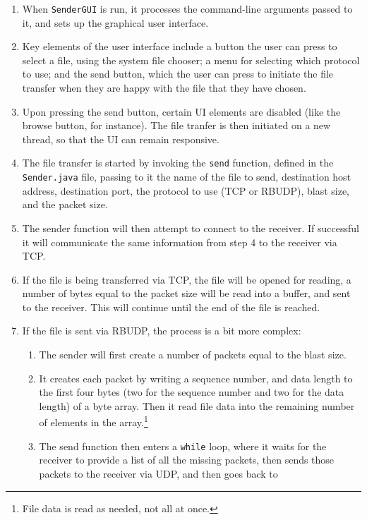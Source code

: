 \documentclass[10pt, a4paper]{article}
\begin{document}
\begin{enumerate}
  \item When \texttt{SenderGUI} is run, it processes the command-line arguments
    passed to it, and sets up the graphical user interface.
  \item Key elements of the user interface include a button the user can press
    to select a file, using the system file chooser; a menu for selecting which
    protocol to use; and the send button, which the user can press to initiate
    the file transfer when they are happy with the file that they have chosen.
  \item Upon pressing the send button, certain UI elements are disabled (like
    the browse button, for instance). The file tranfer is then initiated on a
    new thread, so that the UI can remain responsive.
  \item The file transfer is started by invoking the \texttt{send} function,
    defined in the \texttt{Sender.java} file, passing to it the name of the file
    to send, destination host address, destination port, the protocol to use
    (TCP or RBUDP), blast size, and the packet size.
  \item The sender function will then attempt to connect to the receiver. If
    successful it will communicate the same information from step 4 to the
    receiver via TCP.
  \item If the file is being transferred via TCP, the file will be opened for
    reading, a number of bytes equal to the packet size will be read into a
    buffer, and sent to the receiver. This will continue until the end of the
    file is reached.
  \item If the file is sent via RBUDP, the process is a bit more complex:
    \begin{enumerate}
      \item The sender will first create a number of packets equal to the blast
        size.
      \item It creates each packet by writing a sequence number, and data
        length to the first four bytes (two for the sequence number and two for
        the data length) of a byte array. Then it read file data into the
        remaining number of elements in the array.\footnote{File data is read
        as needed, not all at once.}
      \item The send function then enters a \texttt{while} loop, where it waits
        for the receiver to provide a list of all the missing packets, then
        sends those packets to the receiver via UDP, and then goes back to

\end{enumerate}
\end{enumerate}
\end{document}
